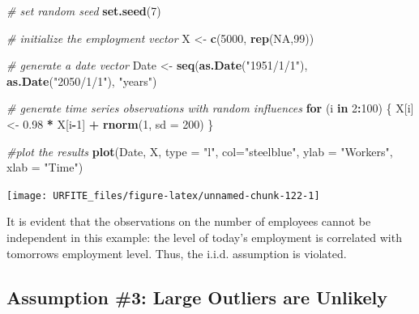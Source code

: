 \documentclass[]{book}
\newenvironment{Shaded}{\begin{snugshade}}{\end{snugshade}}
\newcommand{\KeywordTok}[1]{\textcolor[rgb]{0.13,0.29,0.53}{\textbf{#1}}}
\newcommand{\DataTypeTok}[1]{\textcolor[rgb]{0.13,0.29,0.53}{#1}}
\newcommand{\DecValTok}[1]{\textcolor[rgb]{0.00,0.00,0.81}{#1}}
\newcommand{\FloatTok}[1]{\textcolor[rgb]{0.00,0.00,0.81}{#1}}
\newcommand{\StringTok}[1]{\textcolor[rgb]{0.31,0.60,0.02}{#1}}
\newcommand{\CommentTok}[1]{\textcolor[rgb]{0.56,0.35,0.01}{\textit{#1}}}
\newcommand{\OtherTok}[1]{\textcolor[rgb]{0.56,0.35,0.01}{#1}}
\newcommand{\ControlFlowTok}[1]{\textcolor[rgb]{0.13,0.29,0.53}{\textbf{#1}}}
\newcommand{\OperatorTok}[1]{\textcolor[rgb]{0.81,0.36,0.00}{\textbf{#1}}}
\newcommand{\NormalTok}[1]{#1}
\theoremstyle{definition}
\theoremstyle{definition}
\theoremstyle{definition}
\theoremstyle{remark}
\begin{document}
\begin{Shaded}
\begin{Highlighting}[]
\CommentTok{# set random seed}
\KeywordTok{set.seed}\NormalTok{(}\DecValTok{7}\NormalTok{)}

\CommentTok{# initialize the employment vector}
\NormalTok{X <-}\StringTok{ }\KeywordTok{c}\NormalTok{(}\DecValTok{5000}\NormalTok{, }\KeywordTok{rep}\NormalTok{(}\OtherTok{NA}\NormalTok{,}\DecValTok{99}\NormalTok{))}

\CommentTok{# generate a date vector}
\NormalTok{Date <-}\StringTok{ }\KeywordTok{seq}\NormalTok{(}\KeywordTok{as.Date}\NormalTok{(}\StringTok{"1951/1/1"}\NormalTok{), }\KeywordTok{as.Date}\NormalTok{(}\StringTok{"2050/1/1"}\NormalTok{), }\StringTok{"years"}\NormalTok{)}

\CommentTok{# generate time series observations with random influences}
\ControlFlowTok{for}\NormalTok{ (i }\ControlFlowTok{in} \DecValTok{2}\OperatorTok{:}\DecValTok{100}\NormalTok{) \{}
\NormalTok{    X[i] <-}\StringTok{ }\FloatTok{0.98} \OperatorTok{*}\StringTok{ }\NormalTok{X[i}\OperatorTok{-}\DecValTok{1}\NormalTok{] }\OperatorTok{+}\StringTok{ }\KeywordTok{rnorm}\NormalTok{(}\DecValTok{1}\NormalTok{, }\DataTypeTok{sd =} \DecValTok{200}\NormalTok{)}
\NormalTok{\}}

\CommentTok{#plot the results}
\KeywordTok{plot}\NormalTok{(Date, X, }\DataTypeTok{type =} \StringTok{"l"}\NormalTok{, }\DataTypeTok{col=}\StringTok{"steelblue"}\NormalTok{, }\DataTypeTok{ylab =} \StringTok{"Workers"}\NormalTok{, }\DataTypeTok{xlab =} \StringTok{"Time"}\NormalTok{)}
\end{Highlighting}
\end{Shaded}

\begin{center}\texttt{[image: URFITE\_files/figure-latex/unnamed-chunk-122-1]} \end{center}

It is evident that the observations on the number of employees cannot be
independent in this example: the level of today's employment is
correlated with tomorrows employment level. Thus, the i.i.d. assumption
is violated.

\subsection*{Assumption \#3: Large Outliers are
Unlikely}\label{assumption-3-large-outliers-are-unlikely}
\end{document}
